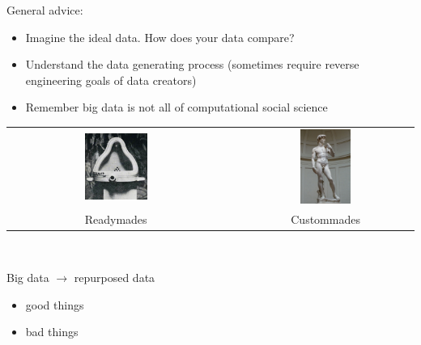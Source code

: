 \documentclass[aspectratio=169]{beamer}
\def\vf{\vfill}
\begin{document}
\begin{frame}

General advice:
\begin{itemize}
\item Imagine the ideal data.  How does your data compare?
\pause
\item Understand the data generating process (sometimes require reverse engineering goals of data creators)
\pause
\item Remember big data is not all of computational social science
\end{itemize}

\end{frame}
\begin{frame}

\begin{center}
\begin{tabular}{ccc}
\includegraphics[width=0.30\textwidth]{figures/duchamp_fountain} & \phantom{12345} & \includegraphics[width=0.30\textwidth]{figures/michelangelo_david} \\
\LARGE{Readymades} &  & \LARGE{Custommades}
\end{tabular}
\end{center}

\vf
\vspace{0.3in}
\\

\end{frame}
\begin{frame}

Big data $\rightarrow$ repurposed data
\pause
\begin{itemize}
\item good things
\item bad things
\end{itemize}

\end{frame}
\end{document}
